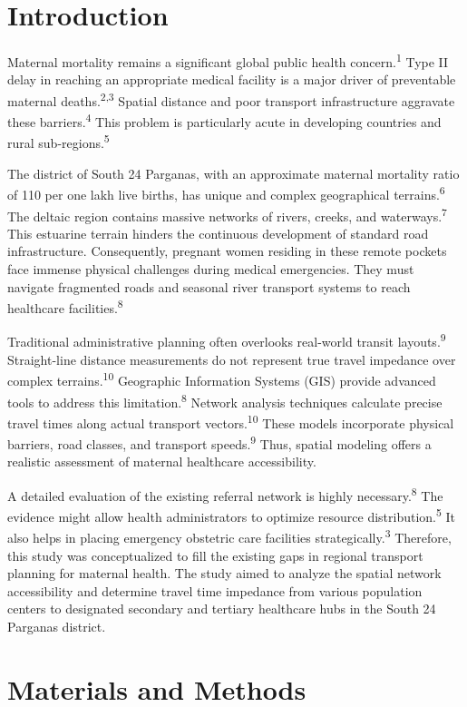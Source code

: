 \documentclass[10pt,twocolumn,letterpaper]{article}
\renewcommand{\cite}[1]{\textsuperscript{#1}}
\begin{document}
\section{Introduction}
Maternal mortality remains a significant global public health concern.\cite{1} Type II delay in reaching an appropriate medical facility is a major driver of preventable maternal deaths.\cite{2,3} Spatial distance and poor transport infrastructure aggravate these barriers.\cite{4} This problem is particularly acute in developing countries and rural sub-regions.\cite{5}

The district of South 24 Parganas, with an approximate maternal mortality ratio of 110 per one lakh live births, has unique and complex geographical terrains.\cite{6} The deltaic region contains massive networks of rivers, creeks, and waterways.\cite{7} This estuarine terrain hinders the continuous development of standard road infrastructure. Consequently, pregnant women residing in these remote pockets face immense physical challenges during medical emergencies. They must navigate fragmented roads and seasonal river transport systems to reach healthcare facilities.\cite{8}

Traditional administrative planning often overlooks real-world transit layouts.\cite{9} Straight-line distance measurements do not represent true travel impedance over complex terrains.\cite{10} Geographic Information Systems (GIS) provide advanced tools to address this limitation.\cite{8} Network analysis techniques calculate precise travel times along actual transport vectors.\cite{10} These models incorporate physical barriers, road classes, and transport speeds.\cite{9} Thus, spatial modeling offers a realistic assessment of maternal healthcare accessibility.

A detailed evaluation of the existing referral network is highly necessary.\cite{8} The evidence might allow health administrators to optimize resource distribution.\cite{5} It also helps in placing emergency obstetric care facilities strategically.\cite{3} Therefore, this study was conceptualized to fill the existing gaps in regional transport planning for maternal health. The study aimed to analyze the spatial network accessibility and determine travel time impedance from various population centers to designated secondary and tertiary healthcare hubs in the South 24 Parganas district.

\section{Materials and Methods}
\end{document}
